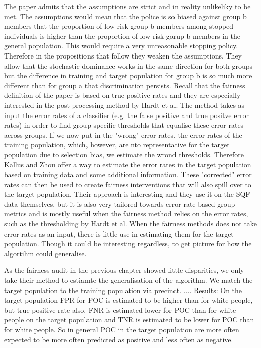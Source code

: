 The paper admits that the assumptions are strict and in reality unlikeliky to be met. The assumptions would mean that the police is so biased against group b members that the proportion of low-risk group b members among stopped individuals is higher than the proportion of low-risk gorup b members in the general population. This would require a very unreasonable stopping policy.
Therefore in the propositions that follow they weaken the assumptions. They allow that the stochastic dominance works in the same direction for both groups but the difference in training and target population for group b is so much more different than for group a that discrimination persists.
Recall that the fairness definition of the paper is based on true positive rates and they are especially interested in the post-processing method by Hardt et al. The method takes as input the error rates of a classifier (e.g. the false positive and true positve error rates) in order to find group-specific thresholds that equalise these error rates across groups.
If we now put in the "wrong" error rates, the error rates of the training population, which, however, are nto representative for the target population due to selection bias, we estimate the wrond thresholds. Therefore Kallus and Zhou offer a way to estimate the error rates in the target population based on training data and some additional information.
These "corrected" error rates can then be used to create fairness interventions that will also spill over to the target population. Their approach is interesting and they use it on the SQF data themselves, but it is also very tailored towards error-rate-based group metrics and is mostly useful when the fairness method relies on the error rates, such as the thresholding by Hardt et al. When the fairness methods does not take error rates as an input, there is little use in estimating them for the target population.
Though it could be interesting regardless, to get picture for how the algortihm could generalise.

As the fairness audit in the previous chapter showed little disparities, we only take their method to estiamte the generalisation of the algorithm.
We match the target population to the training population via precinct.
....
Results:
On the target population FPR for POC is estimated to be higher than for white people, but true positive rate also. FNR is estimated lower for POC than for white people on the target population and TNR is estimated to be lower for POC than for white people. So in general POC in the target population are more often expected to be more often predicted as positive and less often as negative. 

